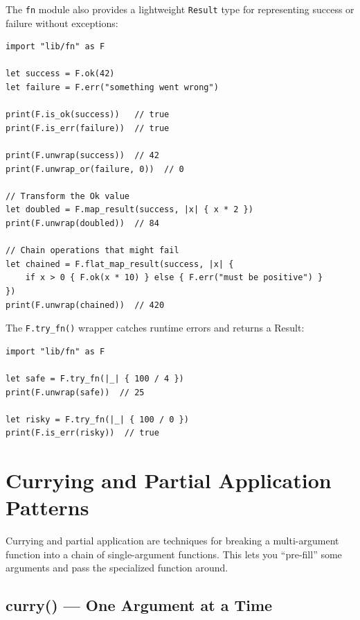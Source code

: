 The \lstinline|fn| module also provides a lightweight \lstinline|Result| type for representing success or failure without exceptions:

\begin{lstlisting}[language=Lattice, caption={The Result type from the fn module}]
import "lib/fn" as F

let success = F.ok(42)
let failure = F.err("something went wrong")

print(F.is_ok(success))   // true
print(F.is_err(failure))  // true

print(F.unwrap(success))  // 42
print(F.unwrap_or(failure, 0))  // 0

// Transform the Ok value
let doubled = F.map_result(success, |x| { x * 2 })
print(F.unwrap(doubled))  // 84

// Chain operations that might fail
let chained = F.flat_map_result(success, |x| {
    if x > 0 { F.ok(x * 10) } else { F.err("must be positive") }
})
print(F.unwrap(chained))  // 420
\end{lstlisting}

The \lstinline|F.try_fn()| wrapper catches runtime errors and returns a Result:

\begin{lstlisting}[language=Lattice, caption={Catching errors with try\_fn}]
import "lib/fn" as F

let safe = F.try_fn(|_| { 100 / 4 })
print(F.unwrap(safe))  // 25

let risky = F.try_fn(|_| { 100 / 0 })
print(F.is_err(risky))  // true
\end{lstlisting}

\section{Currying and Partial Application Patterns}\label{sec:currying}

Currying and partial application are techniques for breaking a multi-argument function into a chain of single-argument functions.
This lets you ``pre-fill'' some arguments and pass the specialized function around.

\subsection{curry() --- One Argument at a Time}\label{subsec:curry}

